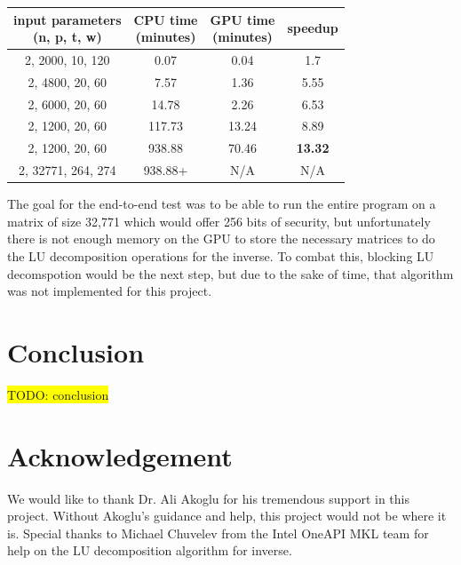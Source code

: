 \documentclass[conference]{IEEEtran}
\begin{document}
        \begin{center}
            {
            \begin{tabular}{ | c | c | c | c |} \hline
                \shortstack{input parameters\\(n, p, t, w)} & \shortstack{CPU time\\(minutes)} & \shortstack{GPU time\\(minutes)} & speedup\\ \hline
                2, 2000, 10, 120 & 0.07 & 0.04 & 1.7\\ \hline
                2, 4800, 20, 60 & 7.57 & 1.36 & 5.55\\ \hline
                2, 6000, 20, 60 & 14.78 & 2.26 & 6.53\\ \hline
                2, 1200, 20, 60 & 117.73 & 13.24 & 8.89\\ \hline
                2, 1200, 20, 60 & 938.88 & 70.46 & \textbf{13.32}\\ \hline
                2, 32771, 264, 274 & 938.88+ & N/A & N/A\\ \hline
            \end{tabular}
            }
            \label{fig:E2E_table}
        \end{center}
            
            
        The goal for the end-to-end test was to be able to run the entire program on a matrix of size 32,771 which would offer 256 bits of security\cite{10.1109/ISIT.2013.6620590, 10.1007/978-3-642-29011-4_31}, but unfortunately there is not enough memory on the GPU to store the necessary matrices to do the LU decomposition operations for the inverse. To combat this, blocking LU decomspotion would be the next step, but due to the sake of time, that algorithm was not implemented for this project.
\section{Conclusion}\label{Conclusion}
    \colorbox{yellow}{TODO: conclusion}


\section{Acknowledgement}\label{Acknowledgement}
    We would like to thank Dr. Ali Akoglu for his tremendous support in this project. Without Akoglu's guidance and help, this project would not be where it is. Special thanks to Michael Chuvelev from the Intel OneAPI MKL team for help on the LU decomposition algorithm for inverse.

\printbibliography
\end{document}
